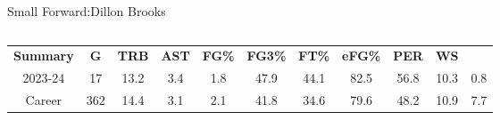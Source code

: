 \begin{frame}{Small Forward:Dillon Brooks}
    \pause
    \begin{columns}
        \begin{column}{0.4\textwidth}
            \begin{table}[h]
                \small
                \centering
                \begin{tabular}{ c|cccc|cccc|cc }
                    \textbf{Summary} & \textbf{G} &\textbf{TRB} &\textbf{AST} & \textbf{FG\%} & \textbf{FG3\%} &\textbf{FT\%} &\textbf{eFG\%} & \textbf{PER} & \textbf{WS} \\
                    2023-24 & 17 & 13.2 & 3.4 & 1.8 & 47.9 & 44.1 & 82.5 & 56.8 & 10.3 & 0.8 \\
                    \pause
                    Career & 362 & 14.4 & 3.1 & 2.1 & 41.8 & 34.6 & 79.6 & 48.2 & 10.9 & 7.7 \\
                \end{tabular}
                \label{fig:player-statistics}
            \end{table}
        \end{column}
        \begin{column}{0.3\textwidth}
            \begin{figure}[t]
                \vspace{-14em}
                \label{fig:Jalen-Green}
            \end{figure}
        \end{column}
    \end{columns}
\end{frame}

